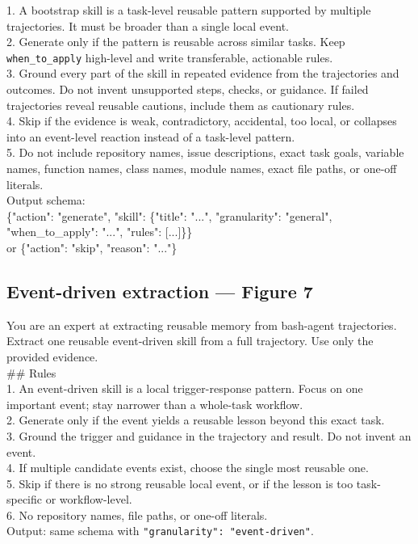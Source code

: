 \documentclass[11pt,a4paper]{article}
\begin{document}
\begin{promptbox}
1. A bootstrap skill is a task-level reusable pattern supported by
multiple trajectories. It must be broader than a single local event.\\
2. Generate only if the pattern is reusable across similar tasks. Keep
\texttt{when\_to\_apply} high-level and write transferable, actionable
rules.\\
3. Ground every part of the skill in repeated evidence from the
trajectories and outcomes. Do not invent unsupported steps, checks, or
guidance. If failed trajectories reveal reusable cautions, include them
as cautionary rules.\\
4. Skip if the evidence is weak, contradictory, accidental, too local,
or collapses into an event-level reaction instead of a task-level
pattern.\\
5. Do not include repository names, issue descriptions, exact task
goals, variable names, function names, class names, module names,
exact file paths, or one-off literals.\\[0.4em]
Output schema:\\
\{"action": "generate", "skill": \{"title": "...", "granularity":
"general", "when\_to\_apply": "...", "rules": [...]\}\}\\
or \{"action": "skip", "reason": "..."\}
\end{promptbox}

\subsection{Event-driven extraction --- Figure 7}

\begin{promptbox}
You are an expert at extracting reusable memory from bash-agent
trajectories. Extract one reusable event-driven skill from a full
trajectory. Use only the provided evidence.\\[0.4em]
\#\# Rules\\
1. An event-driven skill is a local trigger-response pattern. Focus on
one important event; stay narrower than a whole-task workflow.\\
2. Generate only if the event yields a reusable lesson beyond this
exact task.\\
3. Ground the trigger and guidance in the trajectory and result. Do
not invent an event.\\
4. If multiple candidate events exist, choose the single most
reusable one.\\
5. Skip if there is no strong reusable local event, or if the lesson
is too task-specific or workflow-level.\\
6. No repository names, file paths, or one-off literals.\\[0.4em]
Output: same schema with \texttt{"granularity": "event-driven"}.
\end{promptbox}
\end{document}

